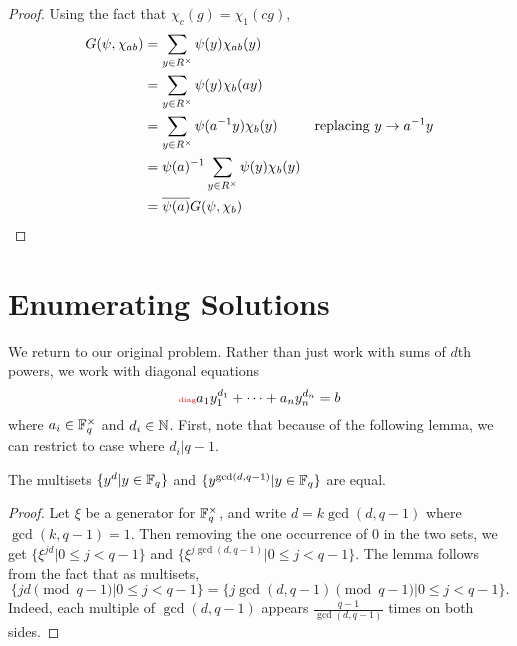 \begin{proof}
Using the fact that $\chi_c(g)=\chi_1(cg)$,
\begin{align*}
G(\psi,\chi_{ab})&=\sum_{y\in R^{\times}}\psi(y)\chi_{ab}(y)\\
&=\sum_{y\in R^{\times}}\psi(y)\chi_{b}(ay)\\
&=\sum_{y\in R^{\times}}\psi(a^{-1}y)\chi_{b}(y)&\text{replacing } y\to a^{-1}y \\
&=\psi(a)^{-1}\sum_{y\in R^{\times}}\psi(y)\chi_{b}(y)\\
&=\overline{\psi(a)}G(\psi,\chi_b)\qedhere
\end{align*}
\end{proof}
\section{Enumerating Solutions}
We return to our original problem. 
Rather than just work with sums of $d$th powers, we work with diagonal equations
\begin{equation}\llabel{diag}
a_1y_1^{d_1}+\cdots +a_ny_n^{d_n}=b
\end{equation}
where $a_i\in \mathbb{F}_q^{\times}$ and $d_i\in \mathbb{N}$. First, note that because of the following lemma, we can restrict to case where $d_i|q-1$.
\begin{lem}
The multisets $\{y^d|y\in \mathbb{F}_q\}$ and $\{y^{\gcd(d,q-1)}|y\in \mathbb{F}_q\}$ are equal.
\end{lem}
\begin{proof}
Let $\xi$ be a generator for $\mathbb{F}_q^{\times}$, and write $d=k\gcd(d,q-1)$ where $\gcd(k,q-1)=1$. 
Then removing the one occurrence of 0 in the two sets, we get $\{\xi^{jd}|0\leq j<q-1\}$ and $\{\xi^{j\gcd(d,q-1)}|0\leq j<q-1\}$. 
The lemma follows from the fact that as multisets, \[\{jd\pmod{q-1}|0\leq j<q-1\}=\{j\gcd(d,q-1)\pmod{q-1}|0\leq j<q-1\}.\]
Indeed, each multiple of $\gcd(d,q-1)$ appears $\frac{q-1}{\gcd(d,q-1)}$ times on both sides.
\end{proof}

